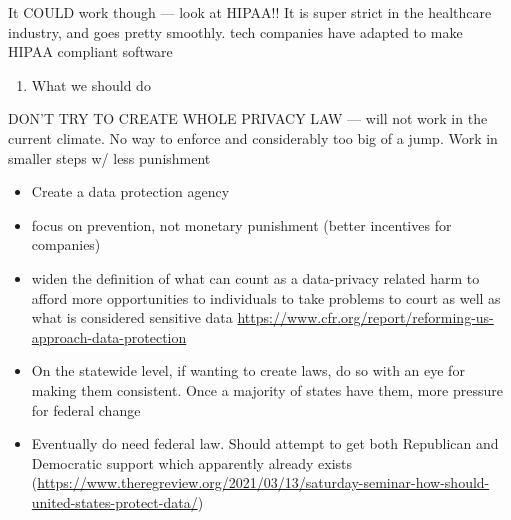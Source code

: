 \documentclass[water,article,submit,moreauthors,pdftex]{mdpi}
\providecommand{\tightlist}{%
  \setlength{\itemsep}{0pt}\setlength{\parskip}{4pt}}
\begin{document}
It COULD work though --- look at HIPAA!! It is super strict in the
healthcare industry, and goes pretty smoothly. tech companies have
adapted to make HIPAA compliant software

\begin{enumerate}
\def\labelenumi{\arabic{enumi}.}
\setcounter{enumi}{6}
\tightlist
\item
  What we should do
\end{enumerate}

DON'T TRY TO CREATE WHOLE PRIVACY LAW --- will not work in the current
climate. No way to enforce and considerably too big of a jump. Work in
smaller steps w/ less punishment

\begin{itemize}
\tightlist
\item
  Create a data protection agency
\item
  focus on prevention, not monetary punishment (better incentives for
  companies)
\item
  widen the definition of what can count as a data-privacy related harm
  to afford more opportunities to individuals to take problems to court
  as well as what is considered sensitive data
  \url{https://www.cfr.org/report/reforming-us-approach-data-protection}
\item
  On the statewide level, if wanting to create laws, do so with an eye
  for making them consistent. Once a majority of states have them, more
  pressure for federal change
\item
  Eventually do need federal law. Should attempt to get both Republican
  and Democratic support which apparently already exists
  (\url{https://www.theregreview.org/2021/03/13/saturday-seminar-how-should-united-states-protect-data/})
\end{itemize}

%

\vspace{6pt}

\end{document}
